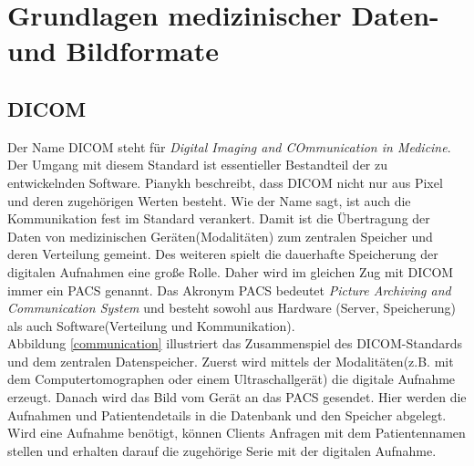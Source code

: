 \chapter{Grundlagen medizinischer Daten- und Bildformate} \label{grundlagen}


\section{DICOM}\label{grundlagen:dicom}
Der Name DICOM steht für \textit{Digital Imaging and COmmunication in Medicine}. Der Umgang mit diesem Standard ist essentieller Bestandteil der zu entwickelnden Software. Pianykh\cite[1]{pianykh:dicom} beschreibt, dass DICOM nicht nur aus Pixel und deren zugehörigen Werten besteht. Wie der Name sagt, ist auch die Kommunikation fest im Standard verankert. Damit ist die Übertragung der Daten von medizinischen Geräten(Modalitäten) zum zentralen Speicher und deren Verteilung gemeint. Des weiteren spielt die dauerhafte Speicherung der digitalen Aufnahmen eine große Rolle. Daher wird im gleichen Zug mit DICOM immer ein PACS genannt. Das Akronym PACS bedeutet \textit{Picture Archiving and Communication System} und besteht sowohl aus Hardware (Server, Speicherung) als auch Software(Verteilung und Kommunikation).\\
Abbildung \ref{communication} illustriert das Zusammenspiel des DICOM-Standards und dem zentralen Datenspeicher. Zuerst wird mittels der Modalitäten(z.B. mit dem Computertomographen oder einem Ultraschallgerät) die digitale Aufnahme erzeugt. Danach wird das Bild vom Gerät an das PACS gesendet. Hier werden die Aufnahmen und Patientendetails in die Datenbank und den Speicher abgelegt. Wird eine Aufnahme benötigt, können Clients Anfragen mit dem Patientennamen stellen und erhalten darauf die zugehörige Serie mit der digitalen Aufnahme.

